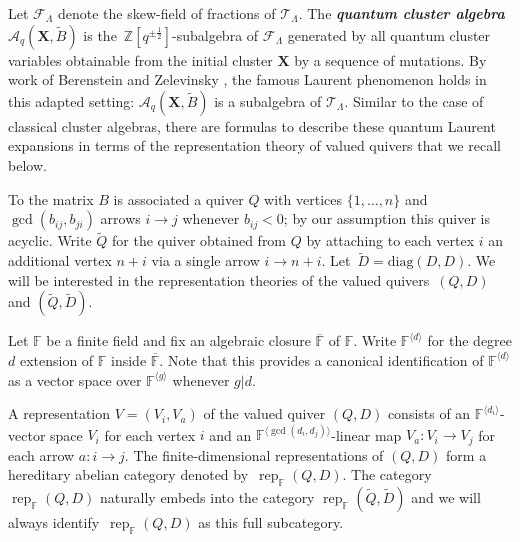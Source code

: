 \documentclass[12pt]{amsart}
\newcommand{\bfX}{\mathbf{X}}
\newcommand{\cA}{\mathcal{A}}
\newcommand{\cF}{\mathcal{F}}
\newcommand{\cT}{\mathcal{T}}
\newcommand{\FF}{\mathbb{F}}
\newcommand{\half}{{\frac{1}{2}}}
\newcommand{\rep}{\operatorname{rep}}
\newcommand{\ZZ}{\mathbb{Z}}
\newcommand{\newword}[1]{\textbf{\emph{#1}}}
\begin{document}
  Let $\cF_\Lambda$ denote the skew-field of fractions of $\cT_\Lambda$.
  The \newword{quantum cluster algebra} $\cA_q(\bfX,\widetilde{B})$ is the~$\ZZ[q^{\pm\half}]$-subalgebra of $\cF_\Lambda$ generated by all quantum cluster variables obtainable from the initial cluster $\bfX$ by a sequence of mutations.
  By work of Berenstein and Zelevinsky \cite{berenstein-zelevinsky}, the famous Laurent phenomenon holds in this adapted setting: $\cA_q(\bfX,\widetilde{B})$ is a subalgebra of $\cT_\Lambda$.
  Similar to the case of classical cluster algebras, there are formulas to describe these quantum Laurent expansions in terms of the representation theory of valued quivers that we recall below.

  To the matrix $B$ is associated a quiver $Q$ with vertices $\{1,\ldots,n\}$ and $\gcd(b_{ij},b_{ji})$ arrows $i\longrightarrow j$ whenever $b_{ij}<0$; by our assumption this quiver is acyclic.
  Write $\widetilde{Q}$ for the quiver obtained from $Q$ by attaching to each vertex $i$ an additional vertex $n+i$ via a single arrow $i\to n+i$. 
  Let~$\widetilde{D}=\mathrm{diag}(D,D)$.
  We will be interested in the representation theories of the valued quivers~$(Q,D)$ and  $(\widetilde{Q},\widetilde{D})$.

  Let $\FF$ be a finite field and fix an algebraic closure $\overline{\FF}$ of $\FF$.  
  Write $\FF^{\langle d\rangle}$ for the degree $d$ extension of $\FF$ inside $\overline{\FF}$.
  Note that this provides a canonical identification of $\FF^{\langle d\rangle}$ as a vector space over $\FF^{\langle g\rangle}$ whenever $g|d$.  
  
  A representation $V=(V_i,V_a)$ of the valued quiver $(Q,D)$ consists of an $\FF^{\langle d_i\rangle}$-vector space $V_i$ for each vertex $i$ and an $\FF^{\langle\gcd(d_i,d_j)\rangle}$-linear map $V_a:V_i\to V_j$ for each arrow $a:i\to j$.  
  The finite-dimensional representations of $(Q,D)$ form a hereditary abelian category denoted by~$\rep_\FF(Q,D)$.  
  The category $\rep_\FF(Q,D)$ naturally embeds into the category $\rep_\FF(\widetilde{Q},\widetilde{D})$ and we will always identify~$\rep_\FF(Q,D)$ as this full subcategory.
\end{document}

